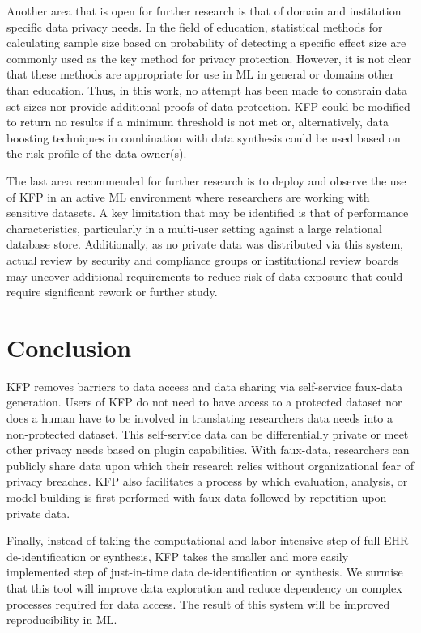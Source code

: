 \documentclass{article}
\begin{document}
Another area that is open for further research is that of domain and institution specific data privacy needs. In the field of education, statistical methods for calculating sample size based on probability of detecting a specific effect size are commonly used \cite{naep_2009} as the key method for privacy protection. However, it is not clear that these methods are appropriate for use in ML in general or domains other than education. Thus, in this work, no attempt has been made to constrain data set sizes nor provide additional proofs of data protection. KFP could be modified to return no results if a minimum threshold is not met or, alternatively, data boosting techniques in combination with data synthesis could be used based on the risk profile of the data owner(s).

The last area recommended for further research is to deploy and observe the use of KFP in an active ML environment where researchers are working with sensitive datasets. A key limitation that may be identified is that of performance characteristics, particularly in a multi-user setting against a large relational database store. Additionally, as no private data was distributed via this system, actual review by security and compliance groups or institutional review boards may uncover additional requirements to reduce risk of data exposure that could require significant rework or further study.

\section{Conclusion}

KFP removes barriers to data access and data sharing via self-service faux-data generation. Users of KFP do not need to have access to a protected dataset nor does a human have to be involved in translating researchers data needs into a non-protected dataset. This self-service data can be differentially private or meet other privacy needs based on plugin capabilities. With faux-data, researchers can publicly share data upon which their research relies without organizational fear of privacy breaches. KFP also facilitates a process by which evaluation, analysis, or model building is first performed with faux-data followed by repetition upon private data. 

Finally, instead of taking the computational and labor intensive step of full EHR de-identification or synthesis, KFP takes the smaller and more easily implemented step of just-in-time data de-identification or synthesis. We surmise that this tool will improve data exploration and reduce dependency on complex processes required for data access. The result of this system will be improved reproducibility in ML.




\end{document}
